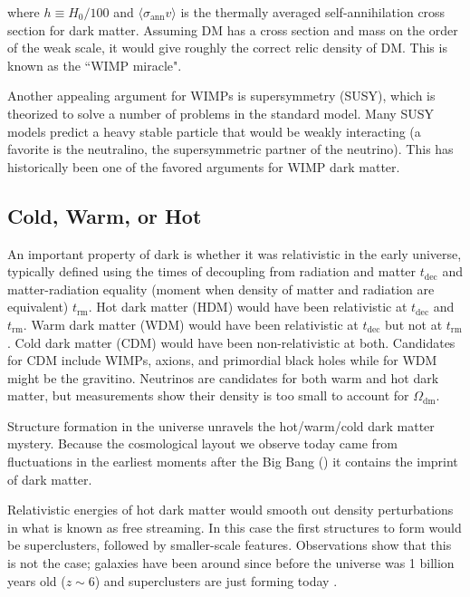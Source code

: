 \noindent where $h \equiv H_0 / 100$ and $\langle \sigma_{\mathrm{ann}} v \rangle$ is
the thermally averaged self-annihilation cross section
for dark matter.  Assuming DM has a cross section and mass on the order of the weak scale,
it would give roughly the correct relic density of DM.  This is known as the ``WIMP miracle".

Another appealing argument for WIMPs is supersymmetry (SUSY), which is theorized to solve a number of problems
in the standard model.  Many SUSY models predict a heavy stable particle that would be weakly interacting (a favorite is the neutralino,
the supersymmetric partner of the neutrino).  This has historically been one of the favored arguments for WIMP dark matter.

\subsection{Cold, Warm, or Hot} \label{subsec:hot_vs_cold}
An important property of dark is whether it was relativistic in the early universe, typically defined using the times of decoupling
from radiation and matter $t_{\mathrm{dec}}$ and matter-radiation equality (moment when density of matter and radiation are equivalent)
$t_{\mathrm{rm}}$.  Hot dark matter (HDM) would have been relativistic at $t_{\mathrm{dec}}$ and $t_{\mathrm{rm}}$.  Warm dark matter
(WDM) would have been relativistic at $t_{\mathrm{dec}}$
but not at $t_{\mathrm{rm}}$.  Cold dark matter (CDM) would have been non-relativistic at both.  Candidates for CDM include
WIMPs, axions, and primordial black holes while for WDM might be the gravitino.  Neutrinos are candidates for both
warm and hot dark matter, but measurements show their density is too small to account for $\Omega_{\mathrm{dm}}$.

Structure formation in the universe unravels the hot/warm/cold dark matter mystery.  Because the cosmological layout we observe
today came from fluctuations in the earliest moments after the Big Bang () it contains the imprint of dark matter.

Relativistic energies of hot dark matter would smooth out density perturbations in what is known as free
streaming.  In this case the first structures to form would be superclusters, followed by smaller-scale
features.  Observations show that this is not the case; galaxies have been around since before the universe
was 1 billion years old ($z \sim 6$) and superclusters are just forming today .

